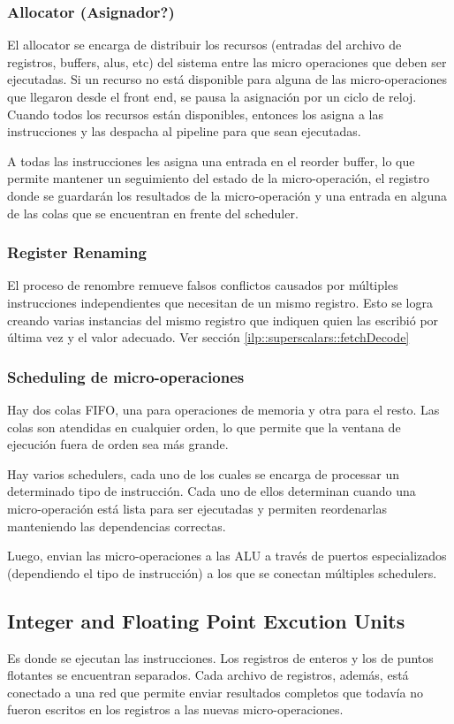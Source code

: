 \subsubsection*{Allocator (Asignador?)}
El allocator se encarga de distribuir los recursos (entradas del archivo de registros, buffers, alus, etc) del sistema entre las micro operaciones que deben ser ejecutadas. Si un recurso no está disponible para alguna de las micro-operaciones que llegaron desde el front end, se pausa la asignación por un ciclo de reloj. Cuando todos los recursos están disponibles, entonces los asigna a las instrucciones y las despacha al pipeline para que sean ejecutadas.

A todas las instrucciones les asigna una entrada en el reorder buffer, lo que permite mantener un seguimiento del estado de la micro-operación, el registro donde se guardarán los resultados de la micro-operación y una entrada en alguna de las colas que se encuentran en frente del scheduler.

\subsubsection*{Register Renaming}
El proceso de renombre remueve falsos conflictos causados por múltiples instrucciones independientes que necesitan de un mismo registro. Esto se logra creando varias instancias del mismo registro que indiquen quien las escribió por última vez y el valor adecuado. Ver sección \ref{ilp::superscalars::fetchDecode} 

\subsubsection*{Scheduling de micro-operaciones}
Hay dos colas FIFO, una para operaciones de memoria y otra para el resto. Las colas son atendidas en cualquier orden, lo que permite que la ventana de ejecución fuera de orden sea más grande.

Hay varios schedulers, cada uno de los cuales se encarga de processar un determinado tipo de instrucción. Cada uno de ellos determinan cuando una micro-operación está lista para ser ejecutadas y permiten reordenarlas manteniendo las dependencias correctas. 

Luego, envian las micro-operaciones a las ALU a través de puertos especializados (dependiendo el tipo de instrucción) a los que se conectan múltiples schedulers.

\subsection{Integer and Floating Point Excution Units}
Es donde se ejecutan las instrucciones.
Los registros de enteros y los de puntos flotantes se encuentran separados. Cada archivo de registros, además, está conectado a una red que permite enviar resultados completos que todavía no fueron escritos en los registros a las nuevas micro-operaciones.

